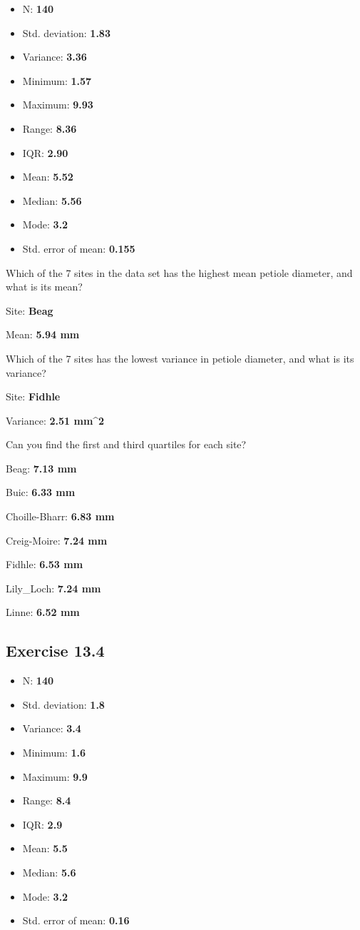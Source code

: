 \documentclass[
]{scrbook}
\providecommand{\tightlist}{%
  \setlength{\itemsep}{0pt}\setlength{\parskip}{0pt}}
\begin{document}
\begin{itemize}
\tightlist
\item
  N: \textbf{140}
\item
  Std. deviation: \textbf{1.83}
\item
  Variance: \textbf{3.36}
\item
  Minimum: \textbf{1.57}
\item
  Maximum: \textbf{9.93}
\item
  Range: \textbf{8.36}
\item
  IQR: \textbf{2.90}
\item
  Mean: \textbf{5.52}
\item
  Median: \textbf{5.56}
\item
  Mode: \textbf{3.2}
\item
  Std. error of mean: \textbf{0.155}
\end{itemize}

Which of the 7 sites in the data set has the highest mean petiole diameter, and what is its
mean?

Site: \textbf{Beag}

Mean: \textbf{5.94 mm}

Which of the 7 sites has the lowest variance in petiole diameter, and what is its variance?

Site: \textbf{Fidhle}

Variance: \textbf{2.51 mm\^{}2}

Can you find the first and third quartiles for each site?

Beag: \textbf{7.13 mm}

Buic: \textbf{6.33 mm}

Choille-Bharr: \textbf{6.83 mm}

Creig-Moire: \textbf{7.24 mm}

Fidhle: \textbf{6.53 mm}

Lily\_Loch: \textbf{7.24 mm}

Linne: \textbf{6.52 mm}

\hypertarget{exercise-13.4}{%
\subsection{Exercise 13.4}\label{exercise-13.4}}

\begin{itemize}
\tightlist
\item
  N: \textbf{140}
\item
  Std. deviation: \textbf{1.8}
\item
  Variance: \textbf{3.4}
\item
  Minimum: \textbf{1.6}
\item
  Maximum: \textbf{9.9}
\item
  Range: \textbf{8.4}
\item
  IQR: \textbf{2.9}
\item
  Mean: \textbf{5.5}
\item
  Median: \textbf{5.6}
\item
  Mode: \textbf{3.2}
\item
  Std. error of mean: \textbf{0.16}
\end{itemize}
\end{document}
